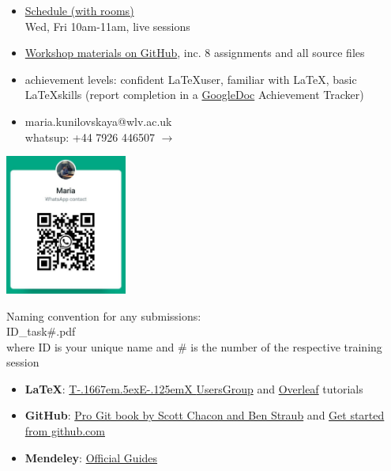\documentclass[a4paper,12pt]{article} %
\def\TeX{{\rm T\kern-.1667em\lower.5ex\hbox{E}\kern-.125emX }}
\newcommand{\llogo}{\LaTeX }
\begin{document}
\begin{center}

\begin{tcolorbox}[width=\textwidth, colback={yellow!40!white}, title={\textbf{Housekeeping}}, colbacktitle=yellow!60!white, coltitle=black]
	
	\begin{multicols}{2}

		\begin{itemize}
			\item \href{https://wlv.instructure.com/courses/33429/pages/latex-and-mendeley-workshop}{Schedule (with rooms)} \\ Wed, Fri 10am-11am, live sessions
			\item \href{https://github.com/kunilovskaya/dskills_workshop}{Workshop materials on GitHub}, inc. 8 assignments and all source files 
			\item achievement levels: confident \llogo user, familiar with \LaTeX, basic \llogo skills (report completion in a \href{https://docs.google.com/document/d/17ZBAQGBKIlO6JMwxz3LlghYq1sdsUjhHVXga46BK0kg/edit?usp=sharing}{GoogleDoc} Achievement Tracker)
			\item maria.kunilovskaya@wlv.ac.uk \\ whatsup: +44 7926 446507 $\rightarrow$
		\end{itemize}
	
	\columnbreak
	\centering
	 \includegraphics[width=40mm]{maria_ku_whatsup_contact}%
	 
	Naming convention for any submissions: \\
	ID\_task\#.pdf \\
	where 
	ID is your unique name and 
	\# is the number of the respective training session
	 
\end{multicols}
\end{tcolorbox}%

\bigskip%

\begin{tcolorbox}[width=\textwidth, colback={white}, title={\textbf{Recommended resources}}, colbacktitle=white, coltitle=black]
	\begin{itemize}
	\item \textbf{LaTeX}: \href{https://tug.org/begin.html}{\TeX UsersGroup} and \href{https://www.overleaf.com/learn/latex/Learn_LaTeX_in_30_minutes}{Overleaf} tutorials
	\item \textbf{GitHub}: \href{https://git-scm.com/book/en/v2}{Pro Git book by Scott Chacon and Ben Straub} and \href{https://docs.github.com/en/get-started}{Get started from github.com}
	\item \textbf{Mendeley}: \href{https://www.mendeley.com/guides}{Official Guides}
	

\end{itemize}
\end{tcolorbox}
\end{center}
\end{document}
